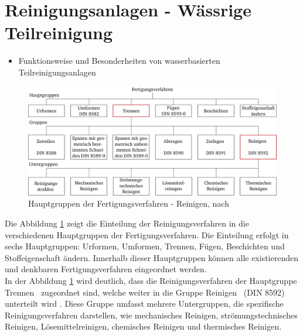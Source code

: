 \section{Reinigungsanlagen - Wässrige Teilreinigung}
\label{ch_03Wässrige Teilreinigung}
\begin{itemize}
	\item Funktionsweise und Besonderheiten von wasserbasierten Teilreinigungsanlagen
\end{itemize}

\begin{figure}[h]
	\centering
	\includegraphics[width=400pt]{figures/03_Grundlagen/Hauptgruppen der Fertigungsverfahren - Reinigen.pdf}
	\caption{Hauptgruppen der Fertigungsverfahren - Reinigen, nach \cite{DIN8580}}
	\label{fig_03Hauptgruppen der Fertigungsverfahren - Reinigen}
\end{figure}

Die Abbildung \ref{fig_03Hauptgruppen der Fertigungsverfahren - Reinigen} zeigt die Einteilung der Reinigungsverfahren in die verschiedenen Hauptgruppen der Fertigungsverfahren. Die Einteilung erfolgt in sechs Hauptgruppen: Urformen, Umformen, Trennen, Fügen, Beschichten und Stoffeigenschaft ändern. Innerhalb dieser Hauptgruppen können alle existierenden und denkbaren Fertigungsverfahren eingeordnet werden.\\

In der Abbildung \ref{fig_03Hauptgruppen der Fertigungsverfahren - Reinigen} wird deutlich, dass die Reinigungsverfahren der Hauptgruppe \glqq Trennen\grqq~ zugeordnet sind, welche weiter in die Gruppe \glqq Reinigen\grqq~ (DIN 8592) unterteilt wird \cite{dindeutschesinstitutfurnormunge.v.FertigungsverfahrenReinigenEinordnungBeuthVerlagGmbH}. Diese Gruppe umfasst mehrere Untergruppen, die spezifische Reinigungsverfahren darstellen, wie mechanisches Reinigen, strömungstechnisches Reinigen, Lösemittelreinigen, chemisches Reinigen und thermisches Reinigen.\\

